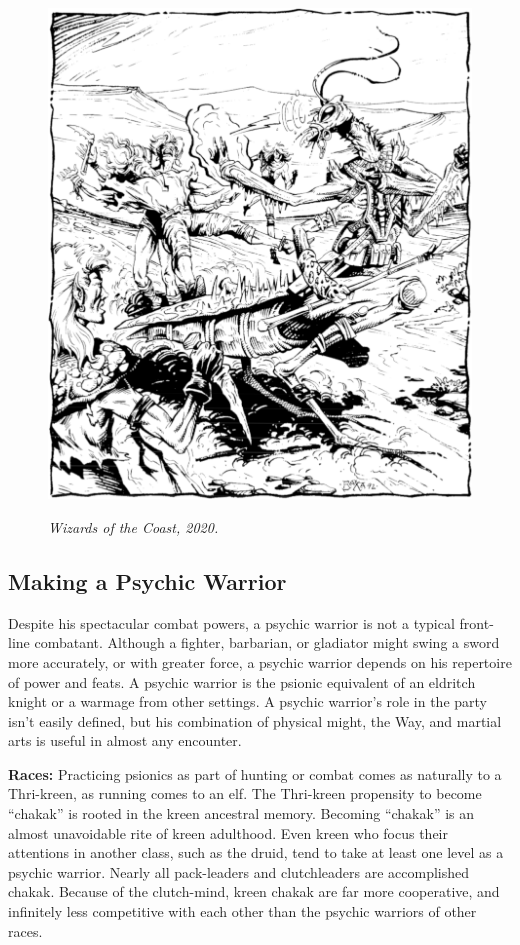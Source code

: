 \begin{figure}[b!]
\centering
\includegraphics[width=\textwidth-1cm]{images/psywarrior-1.png}
\par\textit{\small\textcopyright Wizards of the Coast, 2020.}
\end{figure}

\subsection{Making a Psychic Warrior}
Despite his spectacular combat powers, a psychic warrior is not a typical front-line combatant. Although a fighter, barbarian, or gladiator might swing a sword more accurately, or with greater force, a psychic warrior depends on his repertoire of power and feats. A psychic warrior is the psionic equivalent of an eldritch knight or a warmage from other settings. A psychic warrior's role in the party isn't easily defined, but his combination of physical might, the Way, and martial arts is useful in almost any encounter.

\textbf{Races:} Practicing psionics as part of hunting or combat comes as naturally to a Thri-kreen, as running comes to an elf. The Thri-kreen propensity to become ``chakak'' is rooted in the kreen ancestral memory. Becoming ``chakak'' is an almost unavoidable rite of kreen adulthood. Even kreen who focus their attentions in another class, such as the druid, tend to take at least one level as a psychic warrior. Nearly all pack-leaders and clutchleaders are accomplished chakak. Because of the clutch-mind, kreen chakak are far more cooperative, and infinitely less competitive with each other than the psychic warriors of other races.

